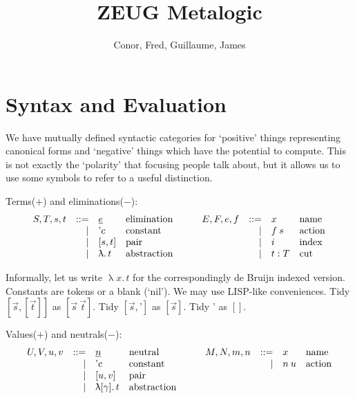 \documentclass{article}
\begin{document}
\title{\textsf{ZEUG} Metalogic}
\author{Conor, Fred, Guillaume, James}
\maketitle

\section{Syntax and Evaluation}

\newcommand{\neu}{\underline}
\newcommand{\lam}[1]{\uplambda #1.\,}
\newcommand{\quo}{\textrm{'}}

We have mutually defined syntactic categories for `positive' things
representing canonical forms and `negative' things which have the potential
to compute. This is not exactly the `polarity' that focusing people talk about,
but it allows us to use some symbols to refer to a useful distinction.

Terms($+$) and eliminations($-$):
\[
\begin{array}[t]{rrl@{\quad}l}
S,T,s,t & ::= & \neu e    & \mbox{elimination}\\
        &   | & \quo c    & \mbox{constant}\\
        &   | & [s, t]    & \mbox{pair}\\
        &   | & \lam {} t & \mbox{abstraction}\\
\end{array}
\qquad
\begin{array}[t]{rrl@{\quad}l}
E,F,e,f & ::= & x & \mbox{name}\\
        &   | & f\:s & \mbox{action}\\
        &   | & i & \mbox{index}\\
        &   | & t : T & \mbox{cut}\\
\end{array}
\]

Informally, let us write $\lam x t$ for the correspondingly de Bruijn indexed version. Constants are tokens or a blank (`nil').
We may use LISP-like conveniences.
Tidy
$[\vec{s},[\vec{t}]]$ as $[\vec{s}\: \vec{t}]$.
Tidy $[\vec{s},\quo]$ as $[\vec{s}]$.
Tidy $\quo$ as $[]$.

Values($+$) and neutrals($-$):
\[
\begin{array}[t]{rrl@{\quad}l}
U,V,u,v & ::= & \neu n    & \mbox{neutral}\\
        &   | & \quo c    & \mbox{constant}\\
        &   | & [u, v]    & \mbox{pair}\\
        &   | & \lam {[\gamma]} t & \mbox{abstraction}\\
\end{array}
\qquad
\begin{array}[t]{rrl@{\quad}l}
M,N,m,n & ::= & x & \mbox{name}\\
        &   | & n\:u & \mbox{action}\\
\end{array}
\]
\end{document}
